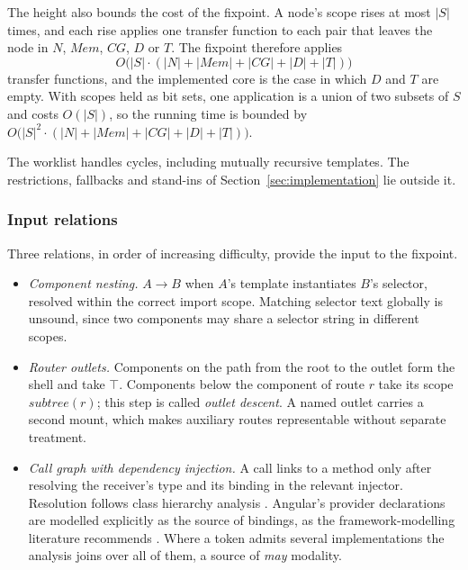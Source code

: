 The height also bounds the cost of the fixpoint. A node's scope rises at most $|S|$ times, and
each rise applies one transfer function to each pair that leaves the node in $N$,
$\mathit{Mem}$, $\mathit{CG}$, $D$ or $T$. The fixpoint therefore applies
\[
  O\bigl(|S| \cdot (|N| + |\mathit{Mem}| + |\mathit{CG}| + |D| + |T|)\bigr)
\]
transfer functions, and the implemented core is the case in which $D$ and $T$ are empty. With
scopes held as bit sets, one application is a union of two subsets of $S$ and costs $O(|S|)$,
so the running time is bounded by
$O\bigl(|S|^2 \cdot (|N| + |\mathit{Mem}| + |\mathit{CG}| + |D| + |T|)\bigr)$.

The worklist handles cycles, including mutually recursive templates. The restrictions,
fallbacks and stand-ins of Section~\ref{sec:implementation} lie outside it.

\subsubsection{Input relations}
\label{sec:inputs}

Three relations, in order of increasing difficulty, provide the input to the fixpoint.
\begin{itemize}
\item \emph{Component nesting.} $A \to B$ when $A$'s template instantiates $B$'s selector,
resolved within the correct import scope. Matching selector text globally is unsound, since two
components may share a selector string in different scopes.
\item \emph{Router outlets.} Components on the path from the root to the outlet form the shell
and take $\top$. Components below the component of route $r$ take its scope
$\mathit{subtree}(r)$; this step is called \emph{outlet descent}. A named outlet carries a second mount, which makes auxiliary routes
representable without separate treatment.
\item \emph{Call graph with dependency injection.} A call links to a method only after resolving
the receiver's type and its binding in the relevant injector. Resolution follows class hierarchy analysis \cite{dean1995cha}. Angular's provider declarations are modelled explicitly as the source
of bindings, as the framework-modelling literature recommends
\cite{sridharan2011f4f,antoniadis2020enterprise}. Where a token admits
several implementations the analysis joins over all of them, a source of \emph{may}
modality.
\end{itemize}

